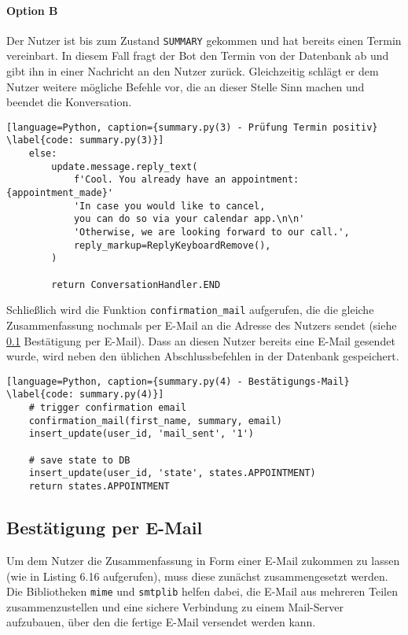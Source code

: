             \paragraph{Option B}
            Der Nutzer ist bis zum Zustand \verb|SUMMARY| gekommen und hat bereits einen Termin vereinbart. In diesem Fall fragt der Bot den Termin von der Datenbank ab und gibt ihn in einer Nachricht an den Nutzer zurück. Gleichzeitig schlägt er dem Nutzer weitere mögliche Befehle vor, die an dieser Stelle Sinn machen und beendet die Konversation.            
            
            \begin{lstlisting}[language=Python, caption={summary.py(3) - Prüfung Termin positiv} \label{code: summary.py(3)}]
    else:
        update.message.reply_text(
            f'Cool. You already have an appointment: {appointment_made}'
            'In case you would like to cancel, 
            you can do so via your calendar app.\n\n'
            'Otherwise, we are looking forward to our call.',
            reply_markup=ReplyKeyboardRemove(),
        )

        return ConversationHandler.END
            \end{lstlisting}

        Schließlich wird die Funktion \verb|confirmation_mail| aufgerufen, die die gleiche Zusammenfassung nochmals per E-Mail an die Adresse des Nutzers sendet (siehe \ref{Implementierung: confirmation_mail.py} Bestätigung per E-Mail). Dass an diesen Nutzer bereits eine E-Mail gesendet wurde, wird neben den üblichen Abschlussbefehlen in der Datenbank gespeichert.
            
            \begin{lstlisting}[language=Python, caption={summary.py(4) - Bestätigungs-Mail} \label{code: summary.py(4)}]
    # trigger confirmation email
    confirmation_mail(first_name, summary, email)
    insert_update(user_id, 'mail_sent', '1')

    # save state to DB
    insert_update(user_id, 'state', states.APPOINTMENT)
    return states.APPOINTMENT
            \end{lstlisting}

                    
        \subsection{Bestätigung per E-Mail} \label{Implementierung: confirmation_mail.py}
            Um dem Nutzer die Zusammenfassung in Form einer E-Mail zukommen zu lassen (wie in Listing 6.16 aufgerufen), muss diese zunächst zusammengesetzt werden. Die Bibliotheken \verb|mime| \cite{email.mime} und \verb|smtplib| \cite{smtplib} helfen dabei, die E-Mail aus mehreren Teilen zusammenzustellen und eine sichere Verbindung zu einem Mail-Server aufzubauen, über den die fertige E-Mail versendet werden kann.\\

